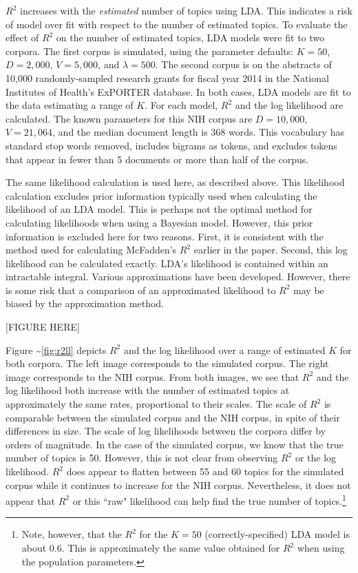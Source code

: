 \documentclass[conference,final,]{IEEEtran}
\begin{document}
\(R^2\) increases with the \textit{estimated} number of topics using
LDA. This indicates a risk of model over fit with respect to the number
of estimated topics. To evaluate the effect of \(R^2\) on the number of
estimated topics, LDA models were fit to two corpora. The first corpus
is simulated, using the parameter defaults: \(K = 50\), \(D = 2,000\),
\(V = 5,000\), and \(\lambda = 500\). The second corpus is on the
abstracts of 10,000 randomly-sampled research grants for fiscal year
2014 in the National Institutes of Health's ExPORTER database. In both
cases, LDA models are fit to the data estimating a range of \(K\). For
each model, \(R^2\) and the log likelihood are calculated. The known
parameters for this NIH corpus are \(D = 10,000\), \(V = 21,064\), and
the median document length is 368 words. This vocabulary has standard
stop words removed, includes bigrams as tokens, and excludes tokens that
appear in fewer than 5 documents or more than half of the corpus.

The same likelihood calculation is used here, as described above. This
likelihood calculation excludes prior information typically used when
calculating the likelihood of an LDA model. This is perhaps not the
optimal method for calculating likelihoods when using a Bayesian model.
However, this prior information is excluded here for two reasons. First,
it is consistent with the method used for calculating McFadden's \(R^2\)
earlier in the paper. Second, this log likelihood can be calculated
exactly. LDA's likelihood is contained within an intractable integral.
Various approximations have been developed. However, there is some risk
that a comparison of an approximated likelihood to \(R^2\) may be biased
by the approximation method.

{[}FIGURE HERE{]}

Figure \textasciitilde{}\ref{fig:r2ll} depicts \(R^2\) and the log
likelihood over a range of estimated \(K\) for both corpora. The left
image corresponds to the simulated corpus. The right image corresponds
to the NIH corpus. From both images, we see that \(R^2\) and the log
likelihood both increase with the number of estimated topics at
approximately the same rates, proportional to their scales. The scale of
\(R^2\) is comparable between the simulated corpus and the NIH corpus,
in spite of their differences in size. The scale of log likelihoods
between the corpora differ by orders of magnitude. In the case of the
simulated corpus, we know that the true number of topics is 50. However,
this is not clear from observing \(R^2\) or the log likelihood. \(R^2\)
does appear to flatten between 55 and 60 topics for the simulated corpus
while it continues to increase for the NIH corpus. Nevertheless, it does
not appear that \(R^2\) or this ``raw" likelihood can help find the true
number of
topics.\footnote{Note, however, that the $R^2$ for the $K = 50$ (correctly-specified) LDA model is about 0.6. This is approximately the same value obtained for $R^2$ when using the population parameters.}
\end{document}
